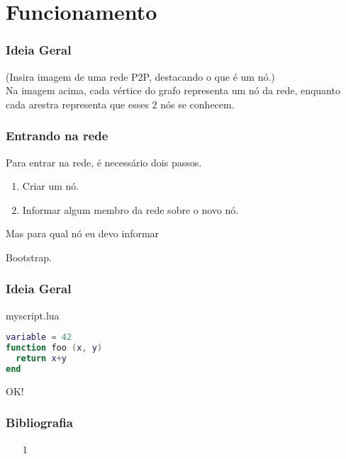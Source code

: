 \documentclass[brazil]{beamer}
\begin{document}
\section{Funcionamento}
\begin{frame}
  \frametitle{Ideia Geral}
  (Insira imagem de uma rede P2P, destacando o que é um nó.) \\
  \vspace{20pt}
  Na imagem acima, cada vértice do grafo representa um nó da rede,
  enquanto cada arestra representa que esses 2 nós se conhecem.
\end{frame}
\begin{frame}
  \frametitle{Entrando na rede}
  Para entrar na rede, é necessário dois passos.
  \pause
  \begin{enumerate}
    \item Criar um nó.
    \pause
    \item Informar algum membro da rede sobre o novo nó.
  \end{enumerate}
  \pause
  \vspace{20pt}
  Mas para qual nó eu devo informar
  
  Bootstrap.
\end{frame}

\begin{frame}[fragile]
  \frametitle{Ideia Geral}
  \pause
  \begin{block}{myscript.lua}
    \begin{lstlisting}[language=lua]
variable = 42
function foo (x, y)
  return x+y
end
    \end{lstlisting}
  \end{block}
\end{frame}
\begin{frame}
  \begin{center}
    \LARGE OK!
  \end{center}
\end{frame}
\begin{frame}
  \frametitle{Bibliografia}
  \begin{itemize}
    \footnotesize
    \item[1]
    \vspace{1em}
  \end{itemize}
\end{frame}
\end{document}
